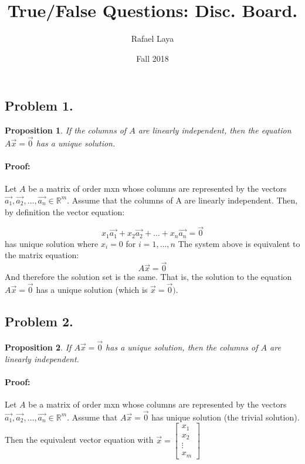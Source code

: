 \documentclass[12pt, letterpaper]{article}
\title{True/False Questions: Disc. Board.}
\author{Rafael Laya}
\date{Fall 2018}
\newcommand{\R}{\mathbb{R}}
\theoremstyle{statement}
\newtheorem*{atmProp}{Proposition}
\newenvironment{atmProof}{\noindent\ignorespaces\paragraph{Proof:}}{\hfill \ding{122}\par\noindent}
\begin{document}
    \maketitle
    
    \subsection*{Problem 1.}
    
    \begin{atmProp}
    If the columns of $A$ are linearly independent, then the equation $A\vec{x}=\vec{0}$ has a unique solution.
    \end{atmProp}
    
    \begin{atmProof}
    Let $A$ be a matrix of order mxn whose columns are represented by the vectors $\vec{a_1}, \vec{a_2}, \dots, \vec{a_n} \in \R^m$.
    Assume that the columns of A are linearly independent. Then, by definition the vector equation:
    
    $$x_1\vec{a_1} + x_2\vec{a_2} + \dots + x_n\vec{a_n} = \vec{0}$$
    has unique solution where $x_i = 0$ for $i = 1, \dots, n$
    The system above is equivalent to the matrix equation:
    $$A\vec{x} = \vec{0}$$
    And therefore the solution set is the same. That is, the solution to the equation $A\vec{x} = \vec{0}$ has a unique solution (which is $\vec{x} = \vec{0})$.
    
    \end{atmProof}
    
    \subsection*{Problem 2.}
    \begin{atmProp}
    If $A\vec{x}=\vec{0}$ has a unique solution, then the columns of $A$ are linearly independent. 
    \end{atmProp}
    \begin{atmProof}
    Let $A$ be a matrix of order mxn whose columns are represented by the vectors $\vec{a_1}, \vec{a_2}, \dots, \vec{a_n} \in \R^m$. Assume that $A\vec{x} = \vec{0}$ has unique solution (the trivial solution). Then the equivalent vector equation with $\vec{x} = \begin{bmatrix} x_1 \\ x_2 \\ \vdots \\ x_m\end{bmatrix}$
    \end{atmProof}
    
\end{document}
